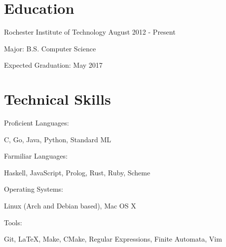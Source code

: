 \documentclass[a4paper,margin,line]{resume}
\newcommand{\rdate}[1]{\hfill {\small #1}}
\begin{document}
\begin{resume}

\section{\mysidestyle Education}
\begin{compactdesc}
    \item[Rochester Institute of Technology] \rdate{August 2012 - Present}
    \begin{asparablank} { \small
        \item Major: B.S. Computer Science
        \item Expected Graduation: May 2017
    } \end{asparablank}
\end{compactdesc}

\section{\mysidestyle Technical Skills}
\begin{compactdesc}
    \item[Proficient Languages:]
    \begin{asparablank} {\small
        \item C, Go, Java, Python, Standard ML
    } \end{asparablank}

    \item[Farmiliar Languages:]
    \begin{asparablank} {\small
        \item Haskell, JavaScript, Prolog, Rust, Ruby, Scheme
    } \end{asparablank}

    \item[Operating Systems:]
    \begin{asparablank} {\small
        \item Linux (Arch and Debian based), Mac OS X
    } \end{asparablank}

    \item[Tools:]
    \begin{asparablank} { \small
        \item Git, \LaTeX, Make, CMake, Regular Expressions, Finite Automata, Vim
    } \end{asparablank}
\end{compactdesc}


\end{resume}
\end{document}
